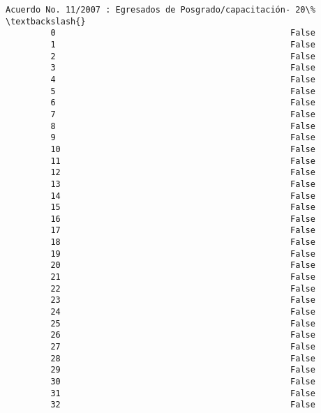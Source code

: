 \documentclass[11pt]{article}
\begin{document}
\begin{Verbatim}[commandchars=\\\{\}]
             Acuerdo No. 11/2007 : Egresados de Posgrado/capacitación- 20\%  \textbackslash{}
         0                                               False               
         1                                               False               
         2                                               False               
         3                                               False               
         4                                               False               
         5                                               False               
         6                                               False               
         7                                               False               
         8                                               False               
         9                                               False               
         10                                              False               
         11                                              False               
         12                                              False               
         13                                              False               
         14                                              False               
         15                                              False               
         16                                              False               
         17                                              False               
         18                                              False               
         19                                              False               
         20                                              False               
         21                                              False               
         22                                              False               
         23                                              False               
         24                                              False               
         25                                              False               
         26                                              False               
         27                                              False               
         28                                              False               
         29                                              False               
         30                                              False               
         31                                              False               
         32                                              False               

\end{Verbatim}
\end{document}
